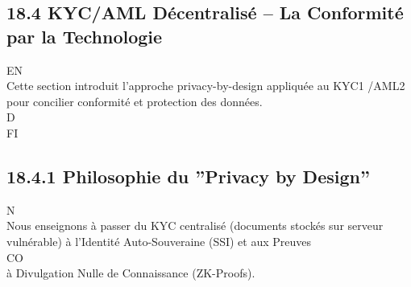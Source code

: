 \documentclass[12pt,landscape,a4paper]{article}
\begin{document}
\subsection{18.4 KYC/AML Décentralisé – La Conformité par la Technologie}
\vspace{0.5em}
\vspace{0.5em}
\vspace{0.5em}
\vspace{0.5em}
EN\\
Cette section introduit l’approche privacy-by-design appliquée au KYC1 /AML2 pour concilier conformité et protection des données.\\
\vspace{0.5em}
\vspace{0.5em}
\vspace{0.5em}
\vspace{0.5em}
D\\
FI\\
\subsection{18.4.1 Philosophie du ”Privacy by Design”}
\vspace{0.5em}
N\\
Nous enseignons à passer du KYC centralisé (documents stockés sur serveur vulnérable) à l’Identité Auto-Souveraine (SSI) et aux Preuves\\
CO\\
à Divulgation Nulle de Connaissance (ZK-Proofs).\\
\vspace{0.5em}
\vspace{0.5em}
\end{document}
